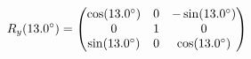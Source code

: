 \documentclass[preview]{standalone}
\begin{document}
\begin{align*}
\special{dvisvgm:raw <g id='unique000'>}R_y(13.0^\circ) = \begin{pmatrix} \cos(13.0^\circ) & 0 & -\sin(13.0^\circ) \\ 0 & 1 & 0 \\ \sin(13.0^\circ) & 0 & \cos(13.0^\circ) \end{pmatrix}\special{dvisvgm:raw </g>}
\end{align*}
\end{document}
